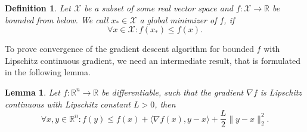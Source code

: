 \documentclass[11pt, a4paper]{article}
\newtheorem{lemma}[theorem]{Lemma}
\newtheorem{definition}[theorem]{Definition}
\newcommand{\R}{\mathds{R}}
\newcommand{\X}{\mathcal{X}}
\begin{document}
\begin{definition}
Let $\X$ be a subset of some real vector space and $f: \X \to \R$ be bounded from below. We call $x_* \in \X$ a global minimizer of $f$, if
\[ \forall x \in \X : f(x_*) \leq f(x). \]
\end{definition}

To prove convergence of the gradient descent algorithm for bounded $f$ with Lipschitz continuous gradient, we need an intermediate result, that is formulated in the following lemma.

\begin{lemma} \label{lem:descent}
Let $f: \R^n \to \R$ be differentiable, such that the gradient $\nabla f$ is Lipschitz continuous with Lipschitz constant $L>0$, then
\[ \forall x,y \in \R^n : f(y) \leq f(x) + \big \langle \nabla f(x) , y -x \big \rangle + \frac{L}{2} \big \| y - x \big \|_2^2. \]
\end{lemma}
\end{document}
